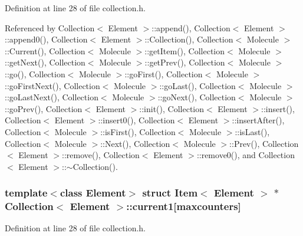 Definition at line 28 of file collection.h.

Referenced by Collection$<$ Element $>$::append(), Collection$<$ Element $>$::append0(), Collection$<$ Element $>$::Collection(), Collection$<$ Molecule $>$::Current(), Collection$<$ Molecule $>$::getItem(), Collection$<$ Molecule $>$::getNext(), Collection$<$ Molecule $>$::getPrev(), Collection$<$ Molecule $>$::go(), Collection$<$ Molecule $>$::goFirst(), Collection$<$ Molecule $>$::goFirstNext(), Collection$<$ Molecule $>$::goLast(), Collection$<$ Molecule $>$::goLastNext(), Collection$<$ Molecule $>$::goNext(), Collection$<$ Molecule $>$::goPrev(), Collection$<$ Element $>$::init(), Collection$<$ Element $>$::insert(), Collection$<$ Element $>$::insert0(), Collection$<$ Element $>$::insertAfter(), Collection$<$ Molecule $>$::isFirst(), Collection$<$ Molecule $>$::isLast(), Collection$<$ Molecule $>$::Next(), Collection$<$ Molecule $>$::Prev(), Collection$<$ Element $>$::remove(), Collection$<$ Element $>$::remove0(), and Collection$<$ Element $>$::$\sim$Collection().\hypertarget{classCollection_7b976f15029014ee3e7a168d19dbe324}{
\subsubsection[{current1}]{\setlength{\rightskip}{0pt plus 5cm}template$<$class Element$>$ struct {\bf Item}$<$ Element $>$ $\ast$ {\bf Collection}$<$ Element $>$::{\bf current1}\mbox{[}{\bf maxcounters}\mbox{]}}}
\label{classCollection_7b976f15029014ee3e7a168d19dbe324}




Definition at line 28 of file collection.h.

